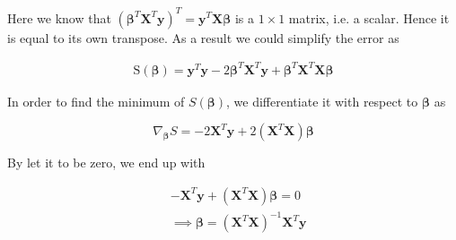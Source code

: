  Here we know that $(\boldsymbol{\beta}^T\boldsymbol{X}^T\boldsymbol{y})^T=\boldsymbol{y}^T\boldsymbol{X}\boldsymbol{\beta}$ is a $1\times 1$ matrix, i.e. a scalar. Hence it is equal to its own transpose. As a result we could simplify the error as
 
 \begin{equation}
 	\begin{split}
 		\text{S}(\boldsymbol{\beta})=\boldsymbol{y}^T\boldsymbol{y}-2\boldsymbol{\beta}^T\boldsymbol{X}^T\boldsymbol{y}+\boldsymbol{\beta}^T\boldsymbol{X}^T\boldsymbol{X}\boldsymbol{\beta}
 	\end{split}
 \end{equation}
 
 In order to find the minimum of $S(\boldsymbol{\beta})$, we differentiate it with respect to $\boldsymbol{\beta}$ as 
 
 \begin{equation}
 	\nabla_{\boldsymbol{\beta}}S=-2\boldsymbol{X}^T\boldsymbol{y}+2(\boldsymbol{X}^T\boldsymbol{X})\boldsymbol{\beta}
 \end{equation}
 
 By let it to be zero, we end up with 
 
 \begin{equation}
 \begin{split}
 	 &	-\boldsymbol{X}^T\boldsymbol{y}+(\boldsymbol{X}^T\boldsymbol{X})\boldsymbol{\beta}=0 \\
 	& \implies \boldsymbol{\beta}= (\boldsymbol{X}^T\boldsymbol{X})^{-1}\boldsymbol{X}^T\boldsymbol{y}
 \end{split}
 \end{equation}

  